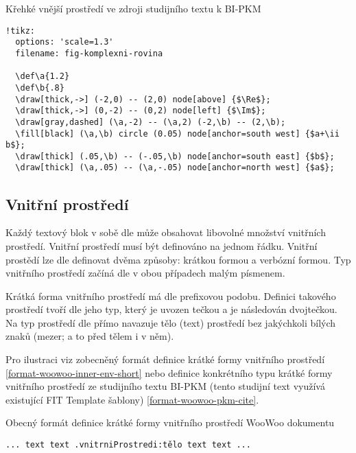 \begin{listing}
    \caption{Křehké vnější prostředí ve zdroji studijního textu k BI-PKM \cite{pkm}}
    \label{format-woowoo-pkm-tikz}
    \begin{verbatim}
!tikz:
  options: 'scale=1.3'
  filename: fig-komplexni-rovina

  \def\a{1.2}
  \def\b{.8}
  \draw[thick,->] (-2,0) -- (2,0) node[above] {$\Re$};
  \draw[thick,->] (0,-2) -- (0,2) node[left] {$\Im$};
  \draw[gray,dashed] (\a,-2) -- (\a,2) (-2,\b) -- (2,\b);
  \fill[black] (\a,\b) circle (0.05) node[anchor=south west] {$a+\ii b$};
  \draw[thick] (.05,\b) -- (-.05,\b) node[anchor=south east] {$b$};
  \draw[thick] (\a,.05) -- (\a,-.05) node[anchor=north west] {$a$};
    \end{verbatim}
\end{listing}

\subsection{Vnitřní prostředí}

Každý textový blok v sobě dle \cite{woowoo} může obsahovat libovolné množství vnitřních prostředí. Vnitřní prostředí
musí být definováno na jednom řádku. Vnitřní prostědí lze dle \cite{woowoo} definovat dvěma způsoby: krátkou formou a
verbózní formou. Typ vnitřního prostředí začíná dle \cite{woowoo} v obou případech malým písmenem.

Krátká forma vnitřního prostředí má dle \cite{woowoo} prefixovou podobu. Definici takového prostředí tvoří dle
\cite{woowoo} jeho typ, který je uvozen tečkou a je následován dvojtečkou. Na typ prostředí dle \cite{woowoo} přímo
navazuje tělo (text) prostředí bez jakýchkoli bílých znaků (mezer; a to před tělem i v něm).

Pro ilustraci viz zobecněný formát definice krátké formy vnitřního prostředí \ref{format-woowoo-inner-env-short} nebo
definice konkrétního typu krátké formy vnitřního prostředí ze studijního textu BI-PKM (tento studijní text využívá
existující FIT Template šablony) \ref{format-woowoo-pkm-cite}.

\begin{listing}
    \caption{Obecný formát definice krátké formy vnitřního prostředí WooWoo dokumentu}
    \label{format-woowoo-inner-env-short}
    \begin{verbatim}
... text text .vnitrniProstredi:tělo text text ...
    \end{verbatim}
\end{listing}

